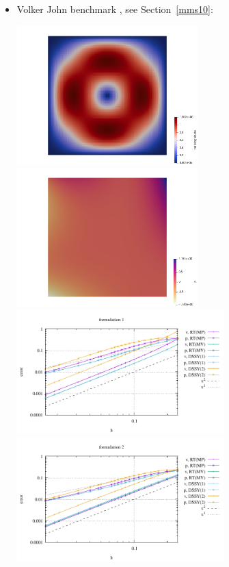 \begin{itemize}
\item Volker John benchmark \cite{jolm17}, see Section~\ref{mms10}:

\begin{center}
\includegraphics[width=7cm]{python_codes/fieldstone_77/results/vj/vel}
\includegraphics[width=7cm]{python_codes/fieldstone_77/results/vj/press}\\
\includegraphics[width=8cm]{python_codes/fieldstone_77/results/vj/errors_form1}
\includegraphics[width=8cm]{python_codes/fieldstone_77/results/vj/errors_form2}\\

\end{center}
\end{itemize}
